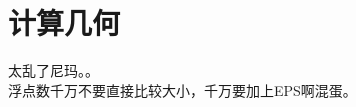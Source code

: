 \section{计算几何}
    太乱了尼玛。。\\
    浮点数千万不要直接比较大小，千万要加上EPS啊混蛋。\\
    
    
    
    
    
     
    
    
    